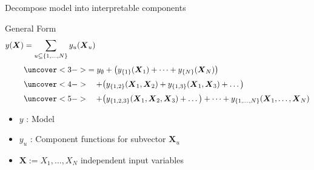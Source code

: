   

\begin{frame}{Decompose model into interpretable components} %
\begin{block}{General Form}
\[
  \begin{aligned}
    y(\boldsymbol{X}) 
    &= \sum_{u \subseteq \{1,\dots,N\}} y_{u}(\boldsymbol{X}_u) \\[3pt]
    &\uncover<3->{= y_{\emptyset} 
       + \big( y_{\{1\}}(\boldsymbol{X}_1) + \dots + y_{\{N\}}(\boldsymbol{X}_N) \big)} \\[2pt]
    &\uncover<4->{\quad + \big( y_{\{1, 2\}}(\boldsymbol{X}_1,\boldsymbol{X}_2) 
                 + y_{\{1, 3\}}(\boldsymbol{X}_1,\boldsymbol{X}_3) + \dots \big)} \\[2pt]
    &\uncover<5->{\quad + \big( y_{\{1, 2, 3\}}(\boldsymbol{X}_1,\boldsymbol{X}_2,\boldsymbol{X}_3) + \dots \big) 
       + \dots + y_{\{1, \dots, N\}}(\boldsymbol{X}_1, \dots, \boldsymbol{X}_N)}
  \end{aligned}
\]
\end{block}

\begin{itemize}
  \item<2-> $y$ : Model
  \item<2-> $y_u$ : Component functions for subvector $\boldsymbol{X}_u$
  \item<2-> $\boldsymbol{X} := X_1, \dots, X_N$ independent input variables
\end{itemize}
\end{frame}


